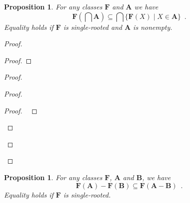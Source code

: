 \documentclass{book}
\let\qed\relax
\newtheorem{prop}[ax]{Proposition}
\theoremstyle{definition}
\begin{document}
\begin{prop}
\label{prop:imgint}
For any classes $\mathbf{F}$ and $\mathbf{A}$ we have
\[ \mathbf{F} \left( \bigcap \mathbf{A} \right) \subseteq \bigcap \{ \mathbf{F}(X) \mid X \in \mathbf{A} \} \enspace . \]
Equality holds if $\mathbf{F}$ is single-rooted and $\mathbf{A}$ is nonempty.
\end{prop}

\begin{proof}
\pf
{}
\begin{proof}
\end{proof}
\begin{proof}
	\begin{proof}
		\begin{proof}
			\pf\ 
		\end{proof}
	\end{proof}
\end{proof}
\qed
\end{proof}

\begin{prop}
\label{prop:imgdiff}
For any classes $\mathbf{F}$, $\mathbf{A}$ and $\mathbf{B}$, we have
\[ \mathbf{F}(\mathbf{A}) - \mathbf{F}(\mathbf{B}) \subseteq \mathbf{F}(\mathbf{A} - \mathbf{B}) \enspace . \]
Equality holds if $\mathbf{F}$ is single-rooted.
\end{prop}
\end{document}
